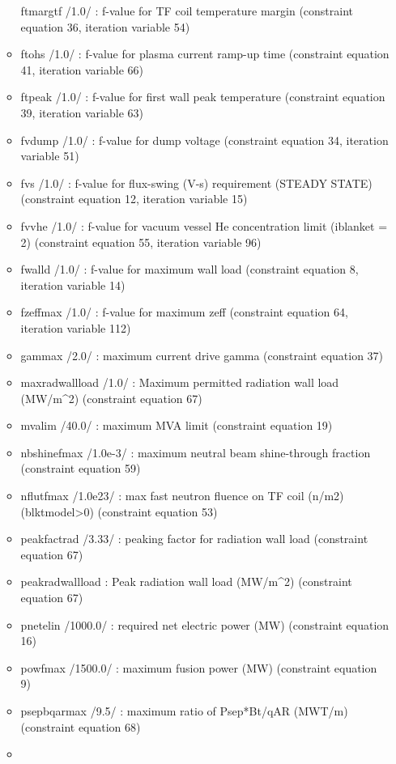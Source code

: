 \documentclass[]{article}
\begin{document}
\begin{itemize}
\begin{itemize}
    ftmargtf /1.0/ : f-value for TF coil temperature margin (constraint
    equation 36, iteration variable 54)
  \item
    ftohs /1.0/ : f-value for plasma current ramp-up time (constraint
    equation 41, iteration variable 66)
  \item
    ftpeak /1.0/ : f-value for first wall peak temperature (constraint
    equation 39, iteration variable 63)
  \item
    fvdump /1.0/ : f-value for dump voltage (constraint equation 34,
    iteration variable 51)
  \item
    fvs /1.0/ : f-value for flux-swing (V-s) requirement (STEADY STATE)
    (constraint equation 12, iteration variable 15)
  \item
    fvvhe /1.0/ : f-value for vacuum vessel He concentration limit
    (iblanket = 2) (constraint equation 55, iteration variable 96)
  \item
    fwalld /1.0/ : f-value for maximum wall load (constraint equation 8,
    iteration variable 14)
  \item
    fzeffmax /1.0/ : f-value for maximum zeff (constraint equation 64,
    iteration variable 112)
  \item
    gammax /2.0/ : maximum current drive gamma (constraint equation 37)
  \item
    maxradwallload /1.0/ : Maximum permitted radiation wall load
    (MW/m\^{}2) (constraint equation 67)
  \item
    mvalim /40.0/ : maximum MVA limit (constraint equation 19)
  \item
    nbshinefmax /1.0e-3/ : maximum neutral beam shine-through fraction
    (constraint equation 59)
  \item
    nflutfmax /1.0e23/ : max fast neutron fluence on TF coil (n/m2)
    (blktmodel\textgreater{}0) (constraint equation 53)
  \item
    peakfactrad /3.33/ : peaking factor for radiation wall load
    (constraint equation 67)
  \item
    peakradwallload : Peak radiation wall load (MW/m\^{}2) (constraint
    equation 67)
  \item
    pnetelin /1000.0/ : required net electric power (MW) (constraint
    equation 16)
  \item
    powfmax /1500.0/ : maximum fusion power (MW) (constraint equation 9)
  \item
    psepbqarmax /9.5/ : maximum ratio of Psep*Bt/qAR (MWT/m) (constraint
    equation 68)
  \item

\end{itemize}
\end{itemize}
\end{document}
